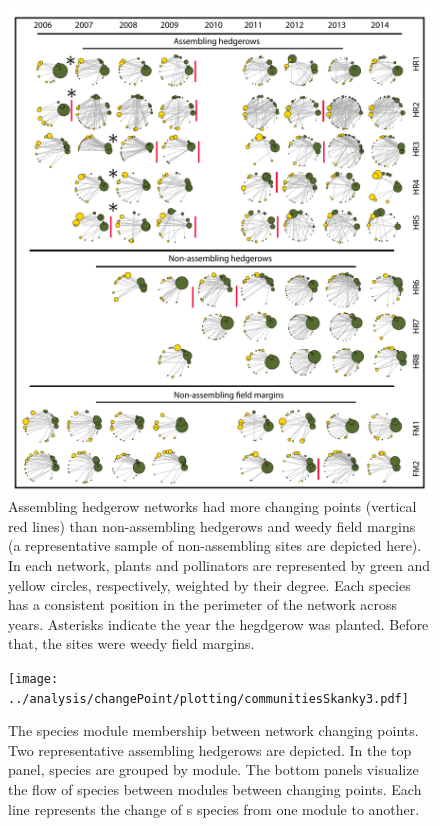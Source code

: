 \documentclass[12pt]{article}
\begin{document}
\begin{figure}
  \centering
  \includegraphics[width=1\textwidth]{../analysis/changePoint/plotting/networksv1.pdf}
  \caption{Assembling hedgerow networks had more changing points
    (vertical red lines) than non-assembling hedgerows and weedy field
    margins (a representative sample of non-assembling sites are
    depicted here). In each network, plants and pollinators are
    represented by green and yellow circles, respectively, weighted by
    their degree. Each species has a consistent position in the
    perimeter of the network across years. Asterisks indicate the year
    the hegdgerow was planted. Before that, the sites were weedy field
    margins.}
  \label{fig:changePoints}
\end{figure}
\clearpage

\begin{figure}
  \centering
  \texttt{[image: ../analysis/changePoint/plotting/communitiesSkanky3.pdf]}
  \caption{The species module membership between network changing
    points. Two representative assembling hedgerows are depicted. In
    the top panel, species are grouped by module. The bottom panels
    visualize the flow of species between modules between changing
    points. Each line represents the change of s species from one
    module to another. }
  \label{fig:changePoints2}
\end{figure}
\clearpage
\end{document}

